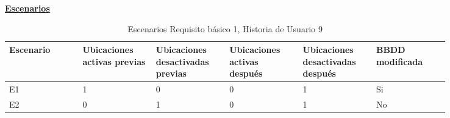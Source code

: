 \documentclass[../ei103948-project-documentation.tex]{subfiles}
\begin{document}
				\begin{center}
				\textbf{\underline{Escenarios}}
				\begin{table}[H]
					\centering
					\begin{tabular}{|p{0.14\linewidth}|p{0.14\linewidth}|p{0.14\linewidth}|p{0.14\linewidth}|p{0.14\linewidth}|p{0.14\linewidth}|}
						\hline
						\textbf{Escenario} & \textbf{Ubicaciones activas previas} & \textbf{Ubicaciones desactivadas previas} & \textbf{Ubicaciones activas después} & \textbf{Ubicaciones desactivadas después} & \textbf{BBDD modificada} \\ \hline
						E1                 & 1                                & 0                                     & 0                                & 1                                     & Si                       \\ \hline
						E2                 & 0                                & 1                                     & 0                                & 1                                     & No                       \\ \hline
						\end{tabular}
					\caption{Escenarios Requisito básico 1, Historia de Usuario 9}
				\end{table}

				\descripcionBasicaI


\end{center}
\end{document}
